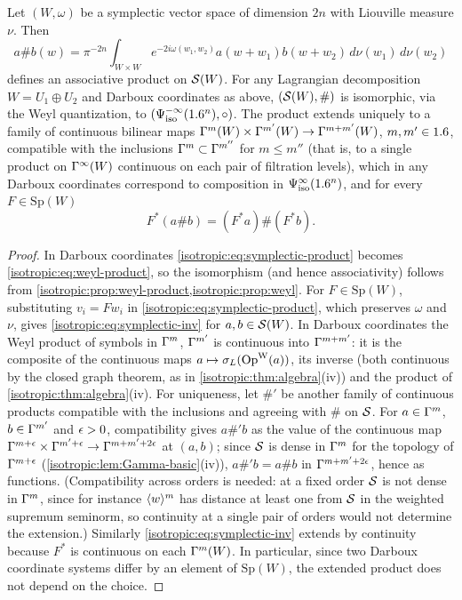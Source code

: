 \begin{theorem}\label{isotropic:thm:symplectic}
Let $(W,\omega)$ be a symplectic vector space of dimension $2n$ with Liouville
measure $\nu$. Then
\begin{equation}\label{isotropic:eq:symplectic-product}
  a\#b(w)=\pi^{-2n}\int_{W\times W}e^{-2i\omega(w_1,w_2)}a(w+w_1)b(w+w_2)\,d\nu(w_1)\,d\nu(w_2)
\end{equation}
defines an associative product on $\mathcal{S}(W)$. For any Lagrangian decomposition
$W=U_1\oplus U_2$ and Darboux coordinates as above, $(\mathcal{S}(W),\#)$ is isomorphic,
via the Weyl quantization, to $(\Psi^{-\infty}_{\mathrm{iso}}(1.6^n),\circ)$. The product
extends uniquely to a family of continuous bilinear maps
$\Gamma^{m}(W)\times\Gamma^{m'}(W)\to\Gamma^{m+m'}(W)$, $m,m'\in1.6$, compatible with the
inclusions $\Gamma^{m}\subset\Gamma^{m''}$ for $m\le m''$ (that is, to a single
product on $\Gamma^{\infty}(W)$ continuous on each pair of filtration levels),
which in any Darboux coordinates correspond to composition in $\Psi^{\infty}_{\mathrm{iso}}(1.6^n)$,
and for every $F\in\mathrm{Sp}(W)$
\begin{equation}\label{isotropic:eq:symplectic-inv}
  F^*(a\#b)=(F^*a)\#(F^*b).
\end{equation}
\end{theorem}
\begin{proof}
In Darboux coordinates \eqref{isotropic:eq:symplectic-product} becomes
\eqref{isotropic:eq:weyl-product}, so the isomorphism (and hence associativity)
follows from \cref{isotropic:prop:weyl-product,isotropic:prop:weyl}. For
$F\in\mathrm{Sp}(W)$, substituting $v_i=Fw_i$ in
\eqref{isotropic:eq:symplectic-product}, which preserves $\omega$ and $\nu$, gives
\eqref{isotropic:eq:symplectic-inv} for $a,b\in\mathcal{S}(W)$. In Darboux coordinates
the Weyl product of symbols in $\Gamma^{m}$, $\Gamma^{m'}$ is continuous into
$\Gamma^{m+m'}$: it is the composite of the continuous maps $a\mapsto\sigma_L(\operatorname{Op}^{\mathrm{W}}(a))$,
its inverse (both continuous by the closed graph theorem, as in
\cref{isotropic:thm:algebra}(iv)) and the product of
\cref{isotropic:thm:algebra}(iv). For uniqueness, let $\#'$ be another family
of continuous products compatible with the inclusions and agreeing with $\#$ on
$\mathcal{S}$. For $a\in\Gamma^{m}$, $b\in\Gamma^{m'}$ and $\epsilon>0$, compatibility gives
$a\#'b$ as the value of the continuous map
$\Gamma^{m+\epsilon}\times\Gamma^{m'+\epsilon}\to\Gamma^{m+m'+2\epsilon}$ at $(a,b)$; since $\mathcal{S}$ is
dense in $\Gamma^{m}$ for the topology of $\Gamma^{m+\epsilon}$
(\cref{isotropic:lem:Gamma-basic}(iv)), $a\#'b=a\#b$ in
$\Gamma^{m+m'+2\epsilon}$, hence as functions. (Compatibility across orders is
needed: at a fixed order $\mathcal{S}$ is not dense in $\Gamma^{m}$, since for instance
$\langle w\rangle^m$ has distance at least one from $\mathcal{S}$ in the weighted supremum
seminorm, so continuity at a single pair of orders would not determine the
extension.) Similarly \eqref{isotropic:eq:symplectic-inv}
extends by continuity because $F^*$ is continuous on each $\Gamma^{m}(W)$. In
particular, since two Darboux coordinate systems differ by an element of
$\mathrm{Sp}(W)$, the extended product does not depend on the choice.
\end{proof}

